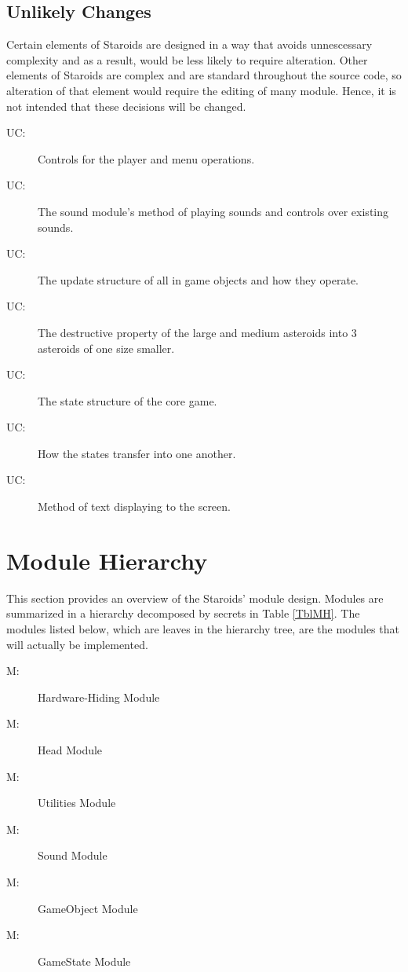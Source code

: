 \documentclass[12pt, titlepage]{article}
\newcounter{ucnum}
\newcommand{\uctheucnum}{UC\theucnum}
\newcounter{mnum}
\newcommand{\mthemnum}{M\themnum}
\begin{document}
\subsection{Unlikely Changes} \label{SecUchange}

Certain elements of Staroids are designed in a way that avoids unnescessary complexity and as a result, would be less likely to require alteration. Other elements of Staroids are complex and are standard throughout the source code, so alteration of that element would require the editing of many module. Hence, it is not intended that these decisions will be changed.

\begin{description}
\item[ \uctheucnum \label{ucUtilities}:] Controls for the player and menu operations.
\item[ \uctheucnum \label{ucSound}:] The sound module's method of playing sounds and controls over existing sounds.
\item[ \uctheucnum \label{ucGameobject}:] The update structure of all in game objects and how they operate.
\item[ \uctheucnum \label{ucGameobject}:] The destructive property of the large and medium asteroids into 3 asteroids of one size smaller.
\item[ \uctheucnum \label{ucGamestate}:] The state structure of the core game.
\item[ \uctheucnum \label{ucGamestate}:] How the states transfer into one another.
\item[ \uctheucnum \label{ucGamestate}:] Method of text displaying to the screen.
\end{description}

\section{Module Hierarchy} \label{SecMH}

This section provides an overview of the Staroids' module design. Modules are summarized
in a hierarchy decomposed by secrets in Table \ref{TblMH}. The modules listed
below, which are leaves in the hierarchy tree, are the modules that will
actually be implemented.

\begin{description}
\item [ \mthemnum \label{mHH}:] Hardware-Hiding Module
\item [ \mthemnum \label{mBHa}:] Head Module
\item [ \mthemnum \label{mBHu}:] Utilities Module
\item [ \mthemnum \label{mBHs}:] Sound Module
\item [ \mthemnum \label{mSDgo}:] GameObject Module
\item [ \mthemnum \label{mSDgs}:] GameState Module
\end{description}
\end{document}
